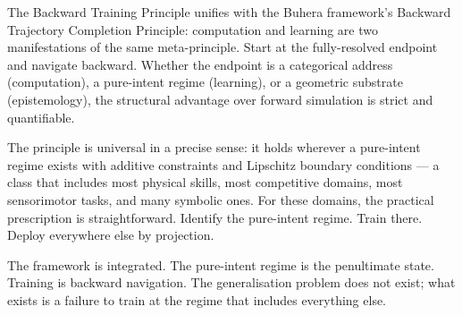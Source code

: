 \documentclass[11pt,twocolumn,a4paper]{article}
\begin{document}
The Backward Training Principle unifies with the Buhera framework's Backward Trajectory Completion Principle: computation and learning are two manifestations of the same meta-principle. Start at the fully-resolved endpoint and navigate backward. Whether the endpoint is a categorical address (computation), a pure-intent regime (learning), or a geometric substrate (epistemology), the structural advantage over forward simulation is strict and quantifiable.

The principle is universal in a precise sense: it holds wherever a pure-intent regime exists with additive constraints and Lipschitz boundary conditions --- a class that includes most physical skills, most competitive domains, most sensorimotor tasks, and many symbolic ones. For these domains, the practical prescription is straightforward. Identify the pure-intent regime. Train there. Deploy everywhere else by projection.

The framework is integrated. The pure-intent regime is the penultimate state. Training is backward navigation. The generalisation problem does not exist; what exists is a failure to train at the regime that includes everything else.



\end{document}
